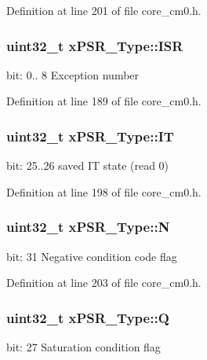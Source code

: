 Definition at line 201 of file core\+\_\+cm0.\+h.

\subsubsection[{\texorpdfstring{I\+SR}{ISR}}]{\setlength{\rightskip}{0pt plus 5cm}uint32\+\_\+t x\+P\+S\+R\+\_\+\+Type\+::\+I\+SR}\hypertarget{unionx_p_s_r___type_a3e9120dcf1a829fc8d2302b4d0673970}{}\label{unionx_p_s_r___type_a3e9120dcf1a829fc8d2302b4d0673970}
bit\+: 0.. 8 Exception number 

Definition at line 189 of file core\+\_\+cm0.\+h.

\subsubsection[{\texorpdfstring{IT}{IT}}]{\setlength{\rightskip}{0pt plus 5cm}uint32\+\_\+t x\+P\+S\+R\+\_\+\+Type\+::\+IT}\hypertarget{unionx_p_s_r___type_a3200966922a194d84425e2807a7f1328}{}\label{unionx_p_s_r___type_a3200966922a194d84425e2807a7f1328}
bit\+: 25..26 saved IT state (read 0) 

Definition at line 198 of file core\+\_\+cm0.\+h.

\subsubsection[{\texorpdfstring{N}{N}}]{\setlength{\rightskip}{0pt plus 5cm}uint32\+\_\+t x\+P\+S\+R\+\_\+\+Type\+::N}\hypertarget{unionx_p_s_r___type_a2db9a52f6d42809627d1a7a607c5dbc5}{}\label{unionx_p_s_r___type_a2db9a52f6d42809627d1a7a607c5dbc5}
bit\+: 31 Negative condition code flag 

Definition at line 203 of file core\+\_\+cm0.\+h.

\subsubsection[{\texorpdfstring{Q}{Q}}]{\setlength{\rightskip}{0pt plus 5cm}uint32\+\_\+t x\+P\+S\+R\+\_\+\+Type\+::Q}\hypertarget{unionx_p_s_r___type_add7cbd2b0abd8954d62cd7831796ac7c}{}\label{unionx_p_s_r___type_add7cbd2b0abd8954d62cd7831796ac7c}
bit\+: 27 Saturation condition flag 

